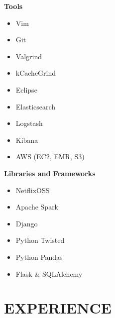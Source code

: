 \documentclass[overlapped]{res}
\begin{document}
\begin{resume}
\begin{multicols}{3}
        \textbf{Tools}
        \begin{itemize}
            \item Vim
            \item Git
            \item Valgrind
            \item kCacheGrind
            \item Eclipse
            \item Elasticsearch
            \item Logstash
            \item Kibana
            \item AWS (EC2, EMR, S3)
        \end{itemize}
        \columnbreak

        \textbf{Libraries and Frameworks}
        \begin{itemize}
            \item NetflixOSS
            \item Apache Spark
            \item Django
            \item Python Twisted
            \item Python Pandas
            \item Flask \& SQLAlchemy
        \end{itemize}
    \end{multicols}

\section{EXPERIENCE}
\vspace{0.125in}


\end{resume}
\end{document}
